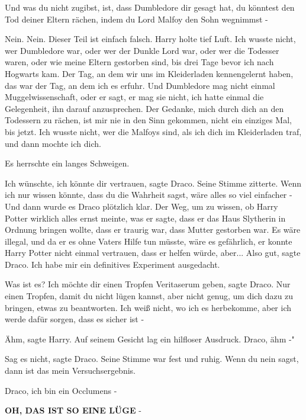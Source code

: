 \glqq{}Und was du nicht zugibst, ist, dass Dumbledore dir gesagt hat, du könntest
den Tod deiner Eltern rächen, indem du Lord Malfoy den Sohn wegnimmst -\grqq{}

\glqq{}Nein. Nein. Dieser Teil ist einfach falsch.\grqq{} Harry holte tief Luft.
\glqq{}Ich wusste nicht, wer Dumbledore war, oder wer der Dunkle Lord war, oder
wer die Todesser waren, oder wie meine Eltern gestorben sind, bis drei Tage
bevor ich nach Hogwarts kam. Der Tag, an dem wir uns im Kleiderladen
kennengelernt haben, das war der Tag, an dem ich es erfuhr. Und Dumbledore mag
nicht einmal Muggelwissenschaft, oder er sagt, er mag sie nicht, ich hatte
einmal die Gelegenheit, ihn darauf anzusprechen. Der Gedanke, mich durch dich an
den Todessern zu rächen, ist mir nie in den Sinn gekommen, nicht ein einziges
Mal, bis jetzt. Ich wusste nicht, wer die Malfoys sind, als ich dich im
Kleiderladen traf, und dann mochte ich dich.\grqq{}

Es herrschte ein langes Schweigen.

\glqq{}Ich wünschte, ich könnte dir vertrauen\grqq{}, sagte Draco. Seine Stimme
zitterte. \glqq{}Wenn ich nur wissen könnte, dass du die Wahrheit sagst, wäre
alles so viel einfacher -\grqq{} Und dann wurde es Draco plötzlich klar. Der
Weg, um zu wissen, ob Harry Potter wirklich alles ernst meinte, was er sagte,
dass er das Haus Slytherin in Ordnung bringen wollte, dass er traurig war, dass
Mutter gestorben war. Es wäre illegal, und da er es ohne Vaters Hilfe tun
müsste, wäre es gefährlich, er konnte Harry Potter nicht einmal vertrauen, dass
er helfen würde, aber... \glqq{}Also gut\grqq{}, sagte Draco. \glqq{}Ich habe mir
ein definitives Experiment ausgedacht.\grqq{}

\glqq{}Was ist es?\grqq{} \glqq{}Ich möchte dir einen Tropfen Veritaserum
geben\grqq{}, sagte Draco. \glqq{}Nur einen Tropfen, damit du nicht lügen kannst,
aber nicht genug, um dich dazu zu bringen, etwas zu beantworten. Ich weiß nicht,
wo ich es herbekomme, aber ich werde dafür sorgen, dass es sicher ist -\grqq{}

\glqq{}Ähm\grqq{}, sagte Harry. Auf seinem Gesicht lag ein hilfloser Ausdruck.
\glqq{}Draco, ähm -"

\glqq{}Sag es nicht\grqq{}, sagte Draco. Seine Stimme war fest und ruhig. \glqq
Wenn du nein sagst, dann ist das mein Versuchsergebnis.\grqq{}

\glqq{}Draco, ich bin ein Occlumens -\grqq{}

\glqq{}\textbf{OH, DAS IST SO EINE LÜGE} -\grqq{}

